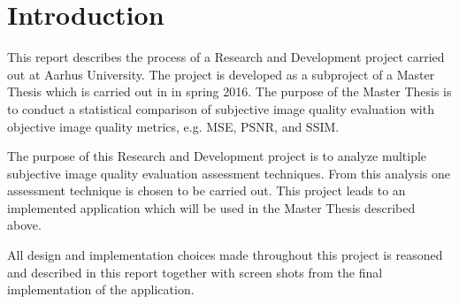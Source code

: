 \graphicspath{{Chapters/Introduction/}}

\chapter{Introduction}
This report describes the process of a Research and Development project carried out at Aarhus University. The project is developed as a subproject of a Master Thesis which is carried out in in spring 2016. The purpose of the Master Thesis is to conduct a statistical comparison of subjective image quality evaluation with objective image quality metrics, e.g. MSE, PSNR, and SSIM.

The purpose of this Research and Development project is to analyze multiple subjective image quality evaluation assessment techniques. From this analysis one assessment technique is chosen to be carried out. This project leads to an implemented application which will be used in the Master Thesis described above.

All design and implementation choices made throughout this project is reasoned and described in this report together with screen shots from the final implementation of the application.